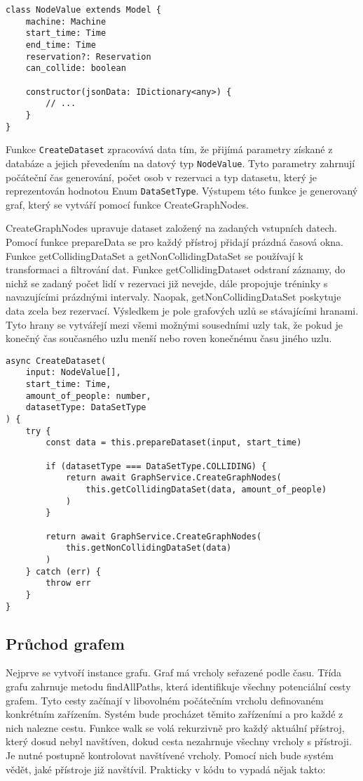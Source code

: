 \begin{lstlisting}
class NodeValue extends Model {
    machine: Machine
    start_time: Time
    end_time: Time
    reservation?: Reservation
    can_collide: boolean

    constructor(jsonData: IDictionary<any>) {
	    // ...
    }
}
\end{lstlisting}

Funkce \texttt{CreateDataset} zpracovává data tím, že přijímá parametry získané z databáze a jejich převedením na datový typ \texttt{NodeValue}. Tyto parametry zahrnují počáteční čas generování, počet osob v rezervaci a typ datasetu, který je reprezentován hodnotou Enum \texttt{DataSetType}. Výstupem této funkce je generovaný graf, který se vytváří pomocí funkce CreateGraphNodes.

CreateGraphNodes upravuje dataset založený na zadaných vstupních datech. Pomocí funkce prepareData se pro každý přístroj přidají prázdná časová okna. Funkce getCollidingDataSet a getNonCollidingDataSet se používají k transformaci a filtrování dat. Funkce getCollidingDataset odstraní záznamy, do nichž se zadaný počet lidí v rezervaci již nevejde, dále propojuje tréninky s navazujícími prázdnými intervaly. Naopak, getNonCollidingDataSet poskytuje data zcela bez rezervací. Výsledkem je pole grafových uzlů se stávajícími hranami. Tyto hrany se vytvářejí mezi všemi možnými sousedními uzly tak, že pokud je konečný čas současného uzlu menší nebo roven konečnému času jiného uzlu.

\begin{lstlisting}
async CreateDataset(
    input: NodeValue[],
    start_time: Time,
    amount_of_people: number,
    datasetType: DataSetType
) {
    try {
	    const data = this.prepareDataset(input, start_time)

	    if (datasetType === DataSetType.COLLIDING) {
		    return await GraphService.CreateGraphNodes(
			    this.getCollidingDataSet(data, amount_of_people)
		    )
	    }

	    return await GraphService.CreateGraphNodes(
		    this.getNonCollidingDataSet(data)
	    )
    } catch (err) {
	    throw err
    }
}
\end{lstlisting}

\subsection{Průchod grafem}

Nejprve se vytvoří instance grafu. Graf má vrcholy seřazené podle času. Třída grafu zahrnuje metodu findAllPaths, která identifikuje všechny potenciální cesty grafem. Tyto cesty začínají v libovolném počátečním vrcholu definovaném konkrétním zařízením. Systém bude procházet těmito zařízeními a pro každé z nich nalezne cestu. Funkce walk se volá rekurzivně pro každý aktuální přístroj, který dosud nebyl navštíven, dokud cesta nezahrnuje všechny vrcholy s přístroji. Je nutné postupně kontrolovat navštívené vrcholy. Pomocí nich bude systém vědět, jaké přístroje již navštívil. Prakticky v kódu to vypadá nějak takto:

